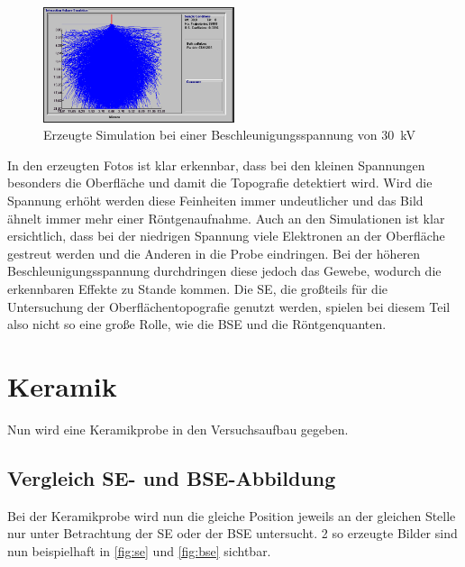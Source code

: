 \documentclass[12pt,english,ngerman]{scrartcl}
\begin{document}
\begin{figure}[H]
	\begin{center}
		\includegraphics[width =0.5\textwidth]{./figures/simulation30kv.png}
	\end{center}
	\caption{Erzeugte Simulation bei einer Beschleunigungsspannung von \SI{30}{\kilo\volt} \cite{sein_foto}}
    \label{fig:simulation30kv}
\end{figure}

In den erzeugten Fotos ist klar erkennbar, dass bei den kleinen Spannungen besonders die Oberfläche und damit die 
Topografie detektiert wird. Wird die Spannung erhöht werden diese Feinheiten immer undeutlicher und das Bild ähnelt 
immer mehr einer Röntgenaufnahme. Auch an den Simulationen ist klar ersichtlich, dass bei der niedrigen Spannung viele
Elektronen an der Oberfläche gestreut werden und die Anderen in die Probe eindringen. Bei der höheren Beschleunigungsspannung
durchdringen diese jedoch das Gewebe, wodurch die erkennbaren Effekte zu Stande kommen. Die SE, die großteils für die 
Untersuchung der Oberflächentopografie genutzt werden, spielen bei diesem Teil also nicht so eine große Rolle, wie die
BSE und die Röntgenquanten.

\section{Keramik}

Nun wird eine Keramikprobe in den Versuchsaufbau gegeben.

\subsection{Vergleich SE- und BSE-Abbildung}
Bei der Keramikprobe wird nun die gleiche Position jeweils an der gleichen Stelle nur unter Betrachtung der SE oder der BSE
untersucht. 2 so erzeugte Bilder sind nun beispielhaft in \autoref{fig:se} und \autoref{fig:bse} sichtbar.

\end{document}
